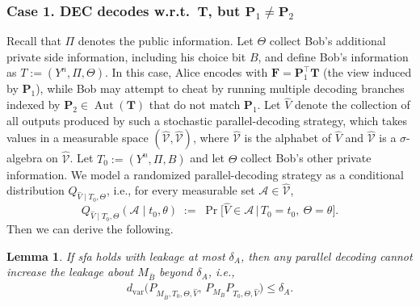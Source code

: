 \documentclass[onecolumn]{IEEEtran} %
\newcommand{\1}{\mathbbm{1}}
\DeclareMathOperator{\Aut}{Aut}
\theoremstyle{boldremark}
\newtheorem{lemma}{Lemma}
\begin{document}
\subsubsection{Case 1. DEC decodes w.r.t.\ $\mathbf T$, but $\mathbf P_1\neq \mathbf P_2$}\label{sec:III-C2}
Recall that $\Pi$ denotes the public information. Let $\Theta$ collect Bob's additional private side information, including his choice bit $B$, and define Bob's information as $T := (Y^n,\Pi,\Theta).$
In this case, Alice encodes with $\mathbf F=\mathbf P_1^{\top}\mathbf T$ (the view induced by $\mathbf P_1$),
while Bob may attempt to cheat by running multiple decoding branches indexed by $\mathbf P_2\in\Aut(\mathbf T)$ that do not
match $\mathbf P_1$. Let $\widehat{V}$ denote the collection of all outputs produced by such a stochastic
parallel-decoding strategy, which takes values in a measurable space $(\widehat{\mathcal V},\widehat{\mathscr V})$, where $\widehat{\mathcal V}$ is the alphabet of $\widehat{V}$ and $\widehat{\mathscr V}$ is a $\sigma$-algebra on
$\widehat{\mathcal V}$. Let $T_0:=(Y^n,\Pi,B)$ and let $\Theta$ collect Bob's other private information.
We model a randomized parallel-decoding strategy as a conditional distribution
$Q_{\widehat{V}\mid T_0,\Theta}$, i.e., for every measurable set $\mathcal{A}\in\widehat{\mathscr V}$,
\[
Q_{\widehat{V}\mid T_0,\Theta}(\mathcal{A}\mid t_0,\theta)
\;:=\;
\Pr\!\big[\widehat{V}\in \mathcal{A}\,\big|\,T_0=t_0,\ \Theta=\theta\big].
\]
Then we can derive the following. 

\begin{lemma}\label{cor:parallel-sfa}
If \gls{sfa} holds with leakage at most $\delta_A$, then any parallel decoding cannot increase the leakage about
$M_{\bar B}$ beyond $\delta_A$, i.e.,
\begin{align}\label{EQ_Case1_result}
d_{\mathrm{var}}\!\bigl(P_{M_{\bar B},T_0,\Theta,\widehat{V}},\,P_{M_{\bar B}}  P_{T_0,\Theta,\widehat{V}}\bigr)
\le \delta_A.
\end{align}
\end{lemma}
\end{document}

